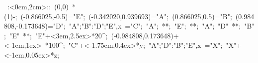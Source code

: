 %


\hbox{
\xy    <2cm,0cm>:<0cm,2cm>::
       (0,0) *\ellipse(1){-}; 
       (-0.866025,-0.5)="E"; (-0.342020,0.939693)="A"; (0.866025,0.5)="B";
       (0.984808,-0.173648)="D"; {"A";"B":"D";"E",x} ="C"; "A"; **\dir{-}; 
       "E"; **\dir{-}; "A"; "D" **\dir{-}; "B"; "E" **\dir{-}; 
       "E"+<3em,2.5ex>*{20^\circ}; (-0.984808,0.173648)+<-1em,1ex> *{100^\circ}; 
       "C"+<-1.75em,0.4ex>*{y}; {"A";"D":"B";"E",x} ="X"; "X"+<-1em,0.05ex>*{z}; 
\endxy}

